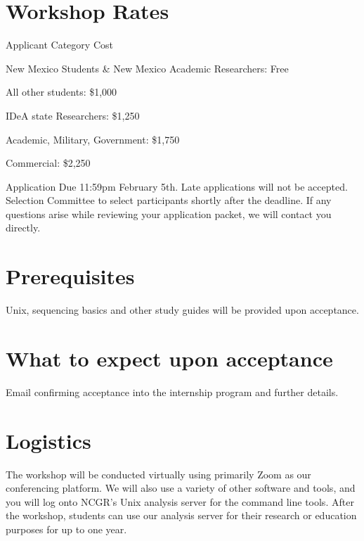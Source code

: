 \documentclass[
]{book}
\begin{document}
\hypertarget{workshop-rates}{%
\section*{Workshop Rates}\label{workshop-rates}}

Applicant Category Cost

New Mexico Students \& New Mexico Academic Researchers:
Free

All other students:
\$1,000

IDeA state Researchers:
\$1,250

Academic, Military, Government:
\$1,750

Commercial:
\$2,250

Application Due 11:59pm February 5th. Late applications will not be accepted. Selection Committee to select participants shortly after the deadline. If any questions arise while reviewing your application packet, we will contact you directly.

\hypertarget{prerequisites}{%
\section*{Prerequisites}\label{prerequisites}}

Unix, sequencing basics and other study guides will be provided upon acceptance.

\hypertarget{what-to-expect-upon-acceptance}{%
\section*{What to expect upon acceptance}\label{what-to-expect-upon-acceptance}}

Email confirming acceptance into the internship program and further details.

\hypertarget{logistics}{%
\section*{Logistics}\label{logistics}}

The workshop will be conducted virtually using primarily Zoom as our conferencing platform. We will also use a variety of other software and tools, and you will log onto NCGR's Unix analysis server for the command line tools. After the workshop, students can use our analysis server for their research or education purposes for up to one year.
\end{document}
